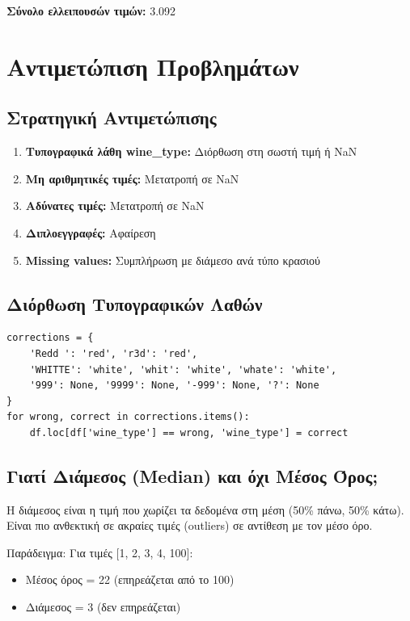 \documentclass[12pt,a4paper]{article}
\begin{document}
\textbf{\textgreek{Σύνολο ελλειπουσών τιμών:}} 3.092

\section{\textgreek{Αντιμετώπιση Προβλημάτων}}

\subsection{\textgreek{Στρατηγική Αντιμετώπισης}}

\begin{enumerate}
    \item \textbf{\textgreek{Τυπογραφικά λάθη wine\_type:}} \textgreek{Διόρθωση στη σωστή τιμή ή NaN}
    \item \textbf{\textgreek{Μη αριθμητικές τιμές:}} \textgreek{Μετατροπή σε NaN}
    \item \textbf{\textgreek{Αδύνατες τιμές:}} \textgreek{Μετατροπή σε NaN}
    \item \textbf{\textgreek{Διπλοεγγραφές:}} \textgreek{Αφαίρεση}
    \item \textbf{Missing values:} \textgreek{Συμπλήρωση με διάμεσο ανά τύπο κρασιού}
\end{enumerate}

\subsection{\textgreek{Διόρθωση Τυπογραφικών Λαθών}}

\begin{lstlisting}
corrections = {
    'Redd ': 'red', 'r3d': 'red',
    'WHITTE': 'white', 'whit': 'white', 'whate': 'white',
    '999': None, '9999': None, '-999': None, '?': None
}
for wrong, correct in corrections.items():
    df.loc[df['wine_type'] == wrong, 'wine_type'] = correct
\end{lstlisting}

\subsection{\textgreek{Γιατί Διάμεσος (Median) και όχι Μέσος Όρος;}}

\textgreek{Η διάμεσος είναι η τιμή που χωρίζει τα δεδομένα στη μέση (50\% πάνω, 50\% κάτω). Είναι πιο ανθεκτική σε ακραίες τιμές (outliers) σε αντίθεση με τον μέσο όρο.}

\textgreek{Παράδειγμα:} \textgreek{Για τιμές [1, 2, 3, 4, 100]:}
\begin{itemize}
    \item \textgreek{Μέσος όρος = 22 (επηρεάζεται από το 100)}
    \item \textgreek{Διάμεσος = 3 (δεν επηρεάζεται)}
\end{itemize}
\end{document}
